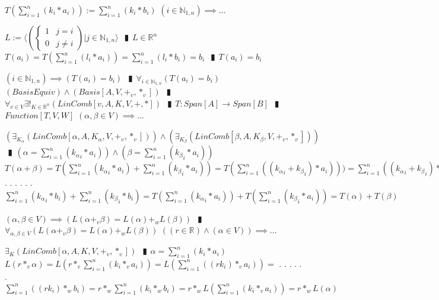 \documentclass{book}
\newcommand{\abr}{:=}
\newcommand{\cont}{\phantom{.}. . .\phantom{.}}
\newcommand{\pipe}{$\phantom{(}\vrectangleblack\phantom{)}$}
\newcommand{\pr}[1]{\left(#1\right)}
\begin{document}
\begin{enumerate}
  \lit $T\pr{\sum_{i = 1}^{n}(k_i * a_i)} \abr \sum_{i = 1}^{n}(k_i * b_i)$
  \lit $(i \in \mathbb{N}_{1, n}) \implies \ldots$
  \begin{enumerate}
    \lit $L \abr \langle \left(\begin{cases} 
      1 & j = i \\
      0 & j \neq i 
    \end{cases}\right) | j \in \mathbb{N}_{1, n} \rangle$ \pipe $L \in \mathbb{R}^n$
    \lit $T(a_i) = T\pr{\sum_{i = 1}^{n}(l_i * a_i)} = \sum_{i = 1}^{n}(l_i * b_i) = b_i$ \pipe $T(a_i) = b_i$
  \end{enumerate}
  \lit $(i \in \mathbb{N}_{1, n}) \implies \pr{T(a_i) = b_i}$ \pipe $\forall_{i \in \mathbb{N}_{1, n}}\pr{T(a_i) = b_i}$
  \lit $(BasisEquiv) \land (Basis[A, V, +_v, *_v])$ \pipe $\forall_{v \in V} \exists!_{K \in \mathbb{R}^n}(LinComb[v, A, K, V, +, *])$ \pipe $T: Span[A] \rightarrow Span[B]$ \pipe $Function[T, V, W]$
  \lit $(\alpha, \beta \in V) \implies \ldots$
  \begin{enumerate}
    \lit $\pr{\exists_{K_\alpha}(LinComb[\alpha, A, K_\alpha, V, +_v, *_v])} \land \pr{\exists_{K_\beta}(LinComb[\beta, A, K_\beta, V, +_v, *_v])}$ \pipe $\pr{\alpha = \sum_{i = 1}^{n}({k_\alpha}_i * a_i)} \land \pr{\beta = \sum_{i = 1}^{n}({k_\beta}_i * a_i)}$
    \lit $T(\alpha + \beta) = T\pr{\sum_{i = 1}^{n}({k_\alpha}_i * a_i) + \sum_{i = 1}^{n}({k_\beta}_i * a_i)} = T\pr{\sum_{i = 1}^{n}\pr{({k_\alpha}_i + {k_\beta}_i) * a_i}}) = \sum_{i = 1}^{n}\pr{({k_\alpha}_i + {k_\beta}_i) * b_i} = $ \cont
    \lit \cont $\sum_{i = 1}^{n}({k_\alpha}_i * b_i) + \sum_{i = 1}^{n}({k_\beta}_i * b_i) = T\pr{\sum_{i = 1}^{n}({k_\alpha}_i * a_i)} + T\pr{\sum_{i = 1}^{n}({k_\beta}_i * a_i)} = T(\alpha) + T(\beta)$
  \end{enumerate}
  \lit $(\alpha, \beta \in V) \implies \pr{L(\alpha +_v \beta) = L(\alpha) +_w L(\beta)}$ \pipe $\forall_{\alpha, \beta \in V}\pr{L(\alpha +_v \beta) = L(\alpha) +_w L(\beta)}$
  \lit $\pr{(r \in \mathbb{R}) \land (\alpha \in V)} \implies \ldots$
  \begin{enumerate}
    \lit $\exists_{K}(LinComb[\alpha, A, K, V, +_v, *_v])$ \pipe $\alpha = \sum_{i = 1}^{n}(k_i * a_i)$
    \lit $L(r *_v \alpha) = L\pr{r *_v \sum_{i = 1}^{n}(k_i *_v a_i)} = L\pr{\sum_{i = 1}^{n}\pr{(r k_i) *_v a_i}} = $ \cont
    \lit \cont $\sum_{i = 1}^{n}\pr{(r k_i) *_w b_i} = r *_w \sum_{i = 1}^{n}(k_i *_w b_i) = r *_w L\pr{\sum_{i = 1}^{n}(k_i *_v a_i)} = r *_w L(\alpha)$
  \end{enumerate}

\end{enumerate}
\end{document}
